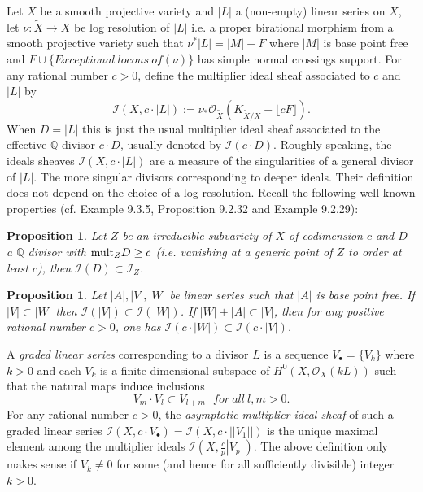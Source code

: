 \documentclass[10pt, a4paper]{amsart}
\newtheorem{prop}[thm]{Proposition}
\newtheorem{ex}[thm]{Example}
\newcommand\mult{{\text{\rm mult}}}
\newcommand\lra{\longrightarrow}
\newcommand\OO{{\mathcal{O}}}
\newcommand\Q{{\mathbb{Q}}}
\newcommand\II{{\mathcal{I}}}
\begin{document}
Let $X$ be a smooth projective variety and $|L|$ a (non-empty)
linear series on $X$, let $\nu : \tilde {X}\lra X$
be log resolution of $|L|$ i.e. a proper birational morphism from a 
smooth projective
variety such that $\nu ^*|L|=|M|+F$ where $|M|$ is base point free and
$F\cup \{ Exceptional \ locous\ of (\nu )\}$ has simple normal crossings support.
For any rational number $c>0$, define the multiplier ideal sheaf
associated to $c$ and $|L|$ by
$$\II (X,c \cdot |L|):= \nu _* \OO _{\tilde{X}}
(K_{\tilde {X}/X}-\lfloor c F \rfloor ).$$
When $D=|L|$ this is just the usual multiplier ideal sheaf associated
to the effective $\Q$-divisor $c\cdot D$, usually denoted by  $\II (c\cdot D)$.
Roughly speaking, the ideals sheaves 
$\II (X,c \cdot |L|)$ are a measure of the singularities
of a general divisor of $|L|$. The more singular divisors corresponding to
deeper ideals. Their definition does not depend  on the choice of a log 
resolution. 
Recall the following well known properties (cf. \cite{La} Example 9.3.5,
Proposition 9.2.32 and Example 9.2.29):
\begin{prop} \label{ideal}
Let $Z$ be an irreducible subvariety of $X$ of codimension $c$ and $D$ a $\Q$ divisor
with $\mult _ZD\geq c$ (i.e. vanishing at a generic point of $Z$ to order 
at least $c$), then 
$\II (D)\subset \II _Z$.
\end{prop}
\begin{prop} \label{ideal2}
Let $|A|,|V|,|W|$ be linear series such that $|A|$ is base point free.
If $|V|\subset |W|$ then $\II (|V|)\subset \II (|W|)$.
If $|W|+|A|\subset |V|$, then
for any positive rational number $c>0$, one has $\II (c\cdot |W|)
\subset \II (c\cdot |V|)$.
\end{prop}
A {\it graded linear series} corresponding to a divisor $L$
is a sequence $V_{\bullet}=\{ V_k \}$
where $k>0$ and each $V_k$ is a finite dimensional subspace of 
$H^0(X,\OO _X(kL))$ such that the natural maps induce inclusions
$$V_m\cdot V_l \subset V_{l+m}\ \ \ for\ all\ l,m>0 .$$
For any rational number $c>0$, the {\it asymptotic multiplier ideal sheaf} 
of such a graded linear series $\II (X,c\cdot V_{\bullet})=\II (X,c\cdot
||V_1||)$ 
is the unique maximal element among the multiplier ideals
$\II (X,\frac {c}{p}|V_{p}| )$. 
The above definition only makes sense if $V_k\ne 0$ for some (and hence
for all sufficiently divisible) integer $k>0$.
\end{document}

